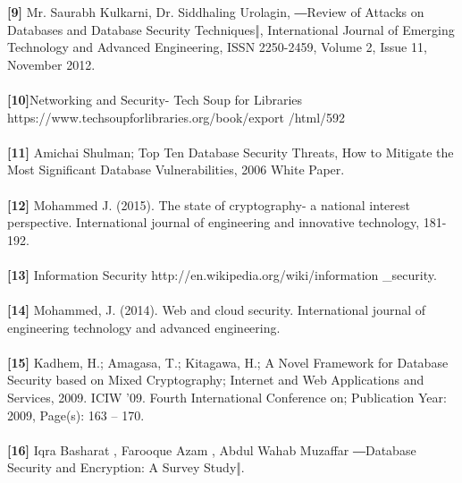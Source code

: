 \begin{thebibliography}
\textbf{[9]} Mr. Saurabh Kulkarni, Dr. Siddhaling Urolagin,
―Review of Attacks on Databases and Database
Security Techniques‖, International Journal of
Emerging Technology and Advanced Engineering,
ISSN 2250-2459, Volume 2, Issue 11,
November 2012.\\\\

\textbf{[10]}Networking and Security- Tech Soup for Libraries
https://www.techsoupforlibraries.org/book/export
/html/592\\\\

\textbf{[11]} Amichai Shulman; Top Ten Database Security Threats,
How to Mitigate the Most Significant Database
Vulnerabilities, 2006 White Paper.\\\\

\textbf{[12]} Mohammed J. (2015). The state of cryptography- a
national interest perspective. International journal of
engineering and innovative technology, 181-
192.\\\\

\textbf{[13]} Information Security
http://en.wikipedia.org/wiki/information \_security.\\\\
\textbf{[14]} Mohammed, J. (2014). Web and cloud security.
International journal of engineering technology and
advanced engineering. \\\\

\textbf{[15]} Kadhem, H.; Amagasa, T.; Kitagawa, H.; A Novel
Framework for Database Security based on Mixed
Cryptography; Internet and Web Applications and
Services, 2009. ICIW '09. Fourth International
Conference on; Publication Year:
2009, Page(s): 163 – 170.\\\\
\textbf{[16]} Iqra Basharat , Farooque Azam , Abdul Wahab
Muzaffar ―Database Security and Encryption: A
Survey Study‖.\\\\

\\\\\\\\\\\\\\\\\\\\\\\\

\end{thebibliography}
